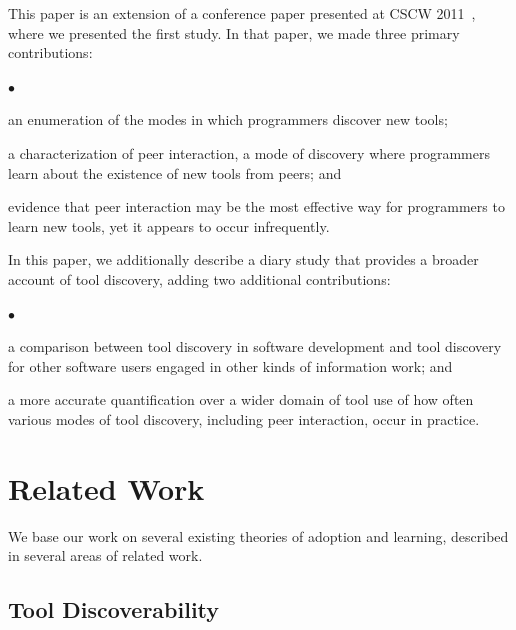 \documentclass[smallextended]{svjour3}
\newcommand{\squishlist}{
	\vspace{0mm}
   \begin{list}{$\bullet$}
    { \setlength{\itemsep}{0pt}      \setlength{\parsep}{3pt}
      \setlength{\topsep}{3pt}       \setlength{\partopsep}{0pt}
      \setlength{\leftmargin}{1.5em} \setlength{\labelwidth}{1em}
      \setlength{\labelsep}{0.5em} } }
\newcommand{\squishend}{
    \end{list}  }
\newcommand\discovery{peer interaction\xspace}
\newcommand\context{mode\xspace}
\newcommand\contexts{modes\xspace}
\begin{document}
This paper is an extension of a conference paper presented at CSCW 2011~\cite{murphy-hill11:peer},
where we presented the first study.
In that paper, we made three primary contributions:

\squishlist
  \item an enumeration of the \contexts in which programmers discover new tools;
  \item a characterization of \discovery, a \context of discovery where
  		programmers learn about the existence of new tools from peers; and
  \item evidence that \discovery may be the most effective way for
  		programmers to learn new tools, yet it appears to occur infrequently.
\squishend

\noindent
In this paper, we additionally describe a diary study that provides a broader account
of tool discovery, adding two additional contributions:

\squishlist
  \item a comparison between tool discovery in software development and tool
  		discovery for other software users engaged in other kinds of information work; and
  \item a more accurate quantification over a wider domain of tool use 
  		of how often various \contexts of tool discovery,
  		including \discovery, occur in practice.
\squishend



\section{Related Work}\label{sec:relatedWork}

\noindent
We base our work on several existing theories of adoption and
learning, described in several areas of related work.

\subsection{Tool Discoverability}\label{sec:terminology}
\end{document}
